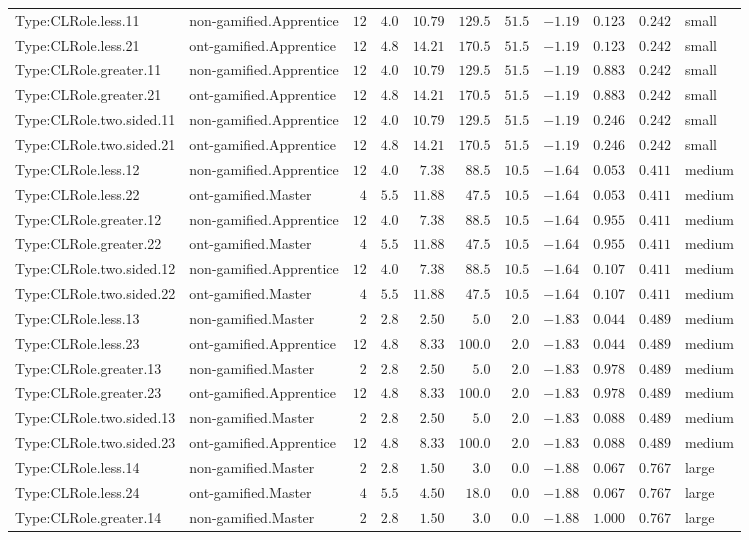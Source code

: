 \documentclass[6pt,a4paper]{article}
\begin{document}
{\begin{longtable}{llrrrrrrrrl}
Type:CLRole.less.11&non-gamified.Apprentice&$12$&$4.0$&$10.79$&$129.5$&$51.5$&$-1.19$&$0.123$&$0.242$&small\tabularnewline
Type:CLRole.less.21&ont-gamified.Apprentice&$12$&$4.8$&$14.21$&$170.5$&$51.5$&$-1.19$&$0.123$&$0.242$&small\tabularnewline
Type:CLRole.greater.11&non-gamified.Apprentice&$12$&$4.0$&$10.79$&$129.5$&$51.5$&$-1.19$&$0.883$&$0.242$&small\tabularnewline
Type:CLRole.greater.21&ont-gamified.Apprentice&$12$&$4.8$&$14.21$&$170.5$&$51.5$&$-1.19$&$0.883$&$0.242$&small\tabularnewline
Type:CLRole.two.sided.11&non-gamified.Apprentice&$12$&$4.0$&$10.79$&$129.5$&$51.5$&$-1.19$&$0.246$&$0.242$&small\tabularnewline
Type:CLRole.two.sided.21&ont-gamified.Apprentice&$12$&$4.8$&$14.21$&$170.5$&$51.5$&$-1.19$&$0.246$&$0.242$&small\tabularnewline
Type:CLRole.less.12&non-gamified.Apprentice&$12$&$4.0$&$ 7.38$&$ 88.5$&$10.5$&$-1.64$&$0.053$&$0.411$&medium\tabularnewline
Type:CLRole.less.22&ont-gamified.Master&$ 4$&$5.5$&$11.88$&$ 47.5$&$10.5$&$-1.64$&$0.053$&$0.411$&medium\tabularnewline
Type:CLRole.greater.12&non-gamified.Apprentice&$12$&$4.0$&$ 7.38$&$ 88.5$&$10.5$&$-1.64$&$0.955$&$0.411$&medium\tabularnewline
Type:CLRole.greater.22&ont-gamified.Master&$ 4$&$5.5$&$11.88$&$ 47.5$&$10.5$&$-1.64$&$0.955$&$0.411$&medium\tabularnewline
Type:CLRole.two.sided.12&non-gamified.Apprentice&$12$&$4.0$&$ 7.38$&$ 88.5$&$10.5$&$-1.64$&$0.107$&$0.411$&medium\tabularnewline
Type:CLRole.two.sided.22&ont-gamified.Master&$ 4$&$5.5$&$11.88$&$ 47.5$&$10.5$&$-1.64$&$0.107$&$0.411$&medium\tabularnewline
Type:CLRole.less.13&non-gamified.Master&$ 2$&$2.8$&$ 2.50$&$  5.0$&$ 2.0$&$-1.83$&$0.044$&$0.489$&medium\tabularnewline
Type:CLRole.less.23&ont-gamified.Apprentice&$12$&$4.8$&$ 8.33$&$100.0$&$ 2.0$&$-1.83$&$0.044$&$0.489$&medium\tabularnewline
Type:CLRole.greater.13&non-gamified.Master&$ 2$&$2.8$&$ 2.50$&$  5.0$&$ 2.0$&$-1.83$&$0.978$&$0.489$&medium\tabularnewline
Type:CLRole.greater.23&ont-gamified.Apprentice&$12$&$4.8$&$ 8.33$&$100.0$&$ 2.0$&$-1.83$&$0.978$&$0.489$&medium\tabularnewline
Type:CLRole.two.sided.13&non-gamified.Master&$ 2$&$2.8$&$ 2.50$&$  5.0$&$ 2.0$&$-1.83$&$0.088$&$0.489$&medium\tabularnewline
Type:CLRole.two.sided.23&ont-gamified.Apprentice&$12$&$4.8$&$ 8.33$&$100.0$&$ 2.0$&$-1.83$&$0.088$&$0.489$&medium\tabularnewline
Type:CLRole.less.14&non-gamified.Master&$ 2$&$2.8$&$ 1.50$&$  3.0$&$ 0.0$&$-1.88$&$0.067$&$0.767$&large\tabularnewline
Type:CLRole.less.24&ont-gamified.Master&$ 4$&$5.5$&$ 4.50$&$ 18.0$&$ 0.0$&$-1.88$&$0.067$&$0.767$&large\tabularnewline
Type:CLRole.greater.14&non-gamified.Master&$ 2$&$2.8$&$ 1.50$&$  3.0$&$ 0.0$&$-1.88$&$1.000$&$0.767$&large\tabularnewline

\end{longtable}}
\end{document}
